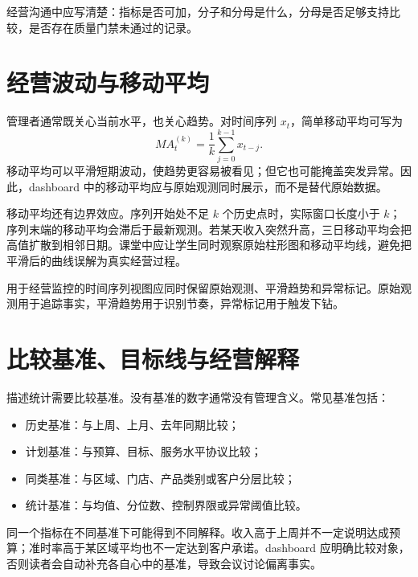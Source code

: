 \documentclass[UTF8,fontset=fandol,openany,zihao=-4]{ctexbook}
\begin{document}
经营沟通中应写清楚：指标是否可加，分子和分母是什么，分母是否足够支持比较，是否存在质量门禁未通过的记录。

\section{经营波动与移动平均}

管理者通常既关心当前水平，也关心趋势。对时间序列 \(x_t\)，简单移动平均可写为
\[
MA_t^{(k)}=\frac{1}{k}\sum_{j=0}^{k-1}x_{t-j}.
\]
移动平均可以平滑短期波动，使趋势更容易被看见；但它也可能掩盖突发异常。因此，dashboard 中的移动平均应与原始观测同时展示，而不是替代原始数据。

移动平均还有边界效应。序列开始处不足 \(k\) 个历史点时，实际窗口长度小于 \(k\)；序列末端的移动平均会滞后于最新观测。若某天收入突然升高，三日移动平均会把高值扩散到相邻日期。课堂中应让学生同时观察原始柱形图和移动平均线，避免把平滑后的曲线误解为真实经营过程。

\begin{proposition}[平滑与异常并存]
用于经营监控的时间序列视图应同时保留原始观测、平滑趋势和异常标记。原始观测用于追踪事实，平滑趋势用于识别节奏，异常标记用于触发下钻。
\end{proposition}

\section{比较基准、目标线与经营解释}

描述统计需要比较基准。没有基准的数字通常没有管理含义。常见基准包括：
\begin{itemize}
  \item 历史基准：与上周、上月、去年同期比较；
  \item 计划基准：与预算、目标、服务水平协议比较；
  \item 同类基准：与区域、门店、产品类别或客户分层比较；
  \item 统计基准：与均值、分位数、控制界限或异常阈值比较。
\end{itemize}

同一个指标在不同基准下可能得到不同解释。收入高于上周并不一定说明达成预算；准时率高于某区域平均也不一定达到客户承诺。dashboard 应明确比较对象，否则读者会自动补充各自心中的基准，导致会议讨论偏离事实。
\end{document}
